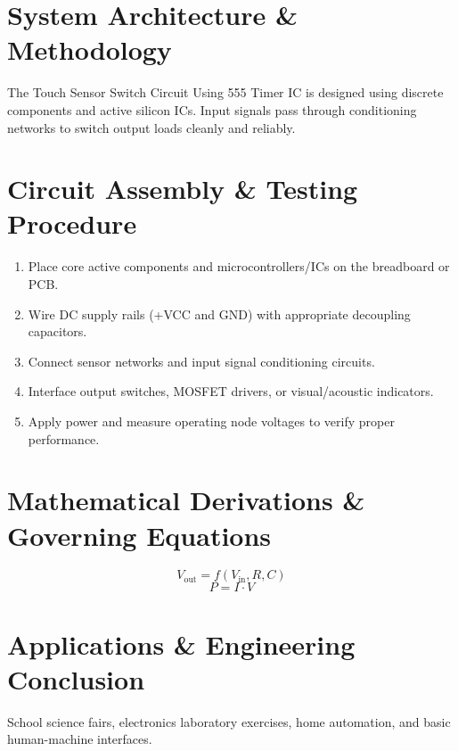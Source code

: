 \documentclass[11pt,a4paper]{article}
\begin{document}
\section{System Architecture \& Methodology}
The Touch Sensor Switch Circuit Using 555 Timer IC is designed using discrete components and active silicon ICs. Input signals pass through conditioning networks to switch output loads cleanly and reliably.

\section{Circuit Assembly \& Testing Procedure}
\begin{enumerate}
    \item Place core active components and microcontrollers/ICs on the breadboard or PCB.
    \item Wire DC supply rails (+VCC and GND) with appropriate decoupling capacitors.
    \item Connect sensor networks and input signal conditioning circuits.
    \item Interface output switches, MOSFET drivers, or visual/acoustic indicators.
    \item Apply power and measure operating node voltages to verify proper performance.
\end{enumerate}

\section{Mathematical Derivations \& Governing Equations}
\begin{equation}
V_{\text{out}} = f(V_{\text{in}}, R, C)
\end{equation}
\begin{equation}
P = I \cdot V
\end{equation}

\section{Applications \& Engineering Conclusion}
School science fairs, electronics laboratory exercises, home automation, and basic human-machine interfaces.
\end{document}
